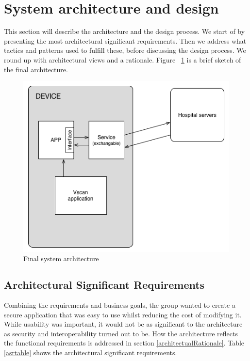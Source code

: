 \section{System architecture and design}
This section will describe the architecture and the design process. We start of by presenting the most architectural significant requirements. Then we address what tactics and patterns used to fulfill these, before discussing the design process. We round up with architectural views and a rationale. Figure ~\ref{fig:overall_architecture} is a brief sketch of the final architecture.

\begin{figure}[H]
\centering
\includegraphics[scale=0.7]{img/system_arch.png}
\caption{Final system architecture}
\label{fig:overall_architecture}
\end{figure}

\newpage


\subsection{Architectural Significant Requirements}
Combining the requirements and business goals, the group wanted to create a secure application that was easy to use whilst reducing the cost of modifying it. While usability was important, it would not be as significant to the architecture as security and interoperability turned out to be. How the architecture reflects the functional requirements is addressed in section \ref{architectualRationale}. Table \ref{asrtable} shows the architectural significant requirements.

